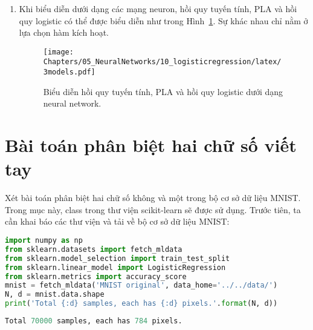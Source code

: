 \begin{enumerate}
Hàm dự đoán đầu ra của các điểm dữ liệu mới có thể được viết như sau:
\begin{lstlisting}[language=Python]
def predict(w, X, threshold = 0.5):
"""
predict output for each row of X
X: a numpy array of shape (N, d), threshold: 0 < threshold < 1
return a 1d numpy array, each element is 0 or 1
"""
res = np.zeros(X.shape[0])
res[np.where(prob(w, X) > threshold)[0]] = 1
return res
\end{lstlisting}
Trong các ví dụ đã nêu, ngưỡng ra quyết định đều được lấy tại 0.5. Trong
nhiều trường hợp, ngưỡng này có thể được thay đổi. Ví dụ, việc xác định các
giao dịch là lừa đảo của một công ty tín dụng là rất quan trọng. Việc phân
loại nhầm một giao dịch lừa đảo thành một giao dịch thông thường gây ra hậu
quả nghiêm trọng hơn chiều ngược lại. Trong bài toán đó, ngưỡng phân loại có
thể giảm xuống còn 0.3. Nghĩa là các giao dịch được dự đoán là lừa đảo với
xác suất lớn hơn 0.3 sẽ được gán nhãn lừa đảo và cần được xử lý bằng các biện pháp khác.



\item Khi biểu diễn dưới dạng các mạng neuron, hồi quy tuyến tính, PLA và
hồi quy logistic có thể được biểu diễn như trong Hình~\ref{fig:10_8}. Sự
khác nhau chỉ nằm ở lựa chọn hàm kích hoạt.
\begin{figure}[t]
\centering
\texttt{[image: Chapters/05\_NeuralNetworks/10\_logisticregression/latex/3models.pdf]}
\caption[]{Biểu diễn hồi quy tuyến tính, PLA và hồi quy logistic
dưới dạng neural network.}
\label{fig:10_8}
\end{figure}

\end{enumerate}










\section{Bài toán phân biệt hai chữ số viết tay }
Xét bài toán phân biệt hai chữ số không và một trong bộ cơ sở dữ liệu MNIST.
Trong mục này, class  trong thư viện
scikit-learn sẽ được sử dụng. Trước tiên, ta cần khai báo các thư viện và tải về
bộ cơ sở dữ liệu MNIST:


\begin{lstlisting}[language=Python]
import numpy as np
from sklearn.datasets import fetch_mldata
from sklearn.model_selection import train_test_split
from sklearn.linear_model import LogisticRegression
from sklearn.metrics import accuracy_score
mnist = fetch_mldata('MNIST original', data_home='../../data/')
N, d = mnist.data.shape
print('Total {:d} samples, each has {:d} pixels.'.format(N, d))
\end{lstlisting}
\kq
\begin{lstlisting}[language=Python]
Total 70000 samples, each has 784 pixels.
\end{lstlisting}

